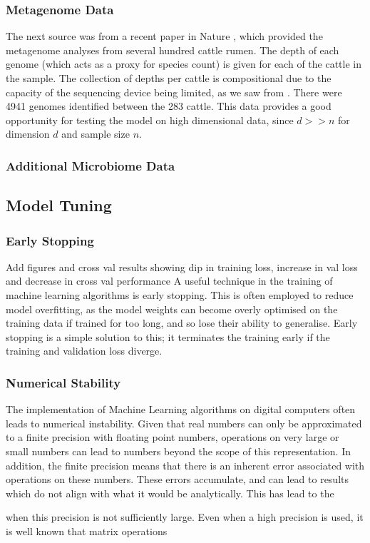 \subsubsection{Metagenome Data}
The next source was from a recent paper in Nature \citep{Stewart2019}, which provided the metagenome analyses from several hundred cattle rumen. The depth of each genome (which acts as a proxy for species count) is given for each of the cattle in the sample. The collection of depths per cattle is compositional due to the capacity of the sequencing device being limited, as we saw from \cite{Gloor2017}. There were 4941 genomes identified between the 283 cattle. This data provides a good opportunity for testing the model on high dimensional data, since $d >> n$ for dimension $d$ and sample size $n$.  

\subsubsection{Additional Microbiome Data}


\subsection{Model Tuning}
\subsubsection{Early Stopping}
Add figures and cross val results showing dip in training loss, increase in val loss and decrease in cross val performance
A useful technique in the training of machine learning algorithms is early stopping. This is often employed to reduce model overfitting, as the model weights can become overly optimised on the training data if trained for too long, and so lose their ability to generalise. Early stopping is a simple solution to this; it terminates the training early if the training and validation loss diverge. 



\subsubsection{Numerical Stability}
The implementation of Machine Learning algorithms on digital computers often leads to numerical instability. Given that real numbers can only be approximated to a finite precision with floating point numbers, operations on very large or small numbers can lead to numbers beyond the scope of this representation. In addition, the finite precision means that there is an inherent error associated with operations on these numbers. These errors accumulate, and can lead to results which do not align with what it would be analytically. This has lead to the 

when this precision is not sufficiently large. Even when a high precision is used, it is well known that matrix operations  










